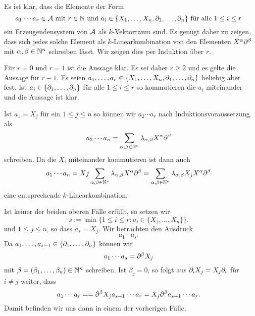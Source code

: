 \documentclass[a4paper,10pt]{article}
\begin{document}
\subsection{}
Es ist klar, dass die Elemente der Form
\[
 a_1 \cdots a_r \in \mathcal{A} \text{ mit }r \in \mathbb{N} \text{ und } a_i \in \{X_1, \ldots, X_n, \partial_1, \ldots, \partial_n\} \text{ für alle } 1 \leq i \leq r
\]
ein Erzeugendensystem von $\mathcal{A}$ als $k$-Vektorraum sind. Es genügt daher zu zeigen, dass sich jedes solche Element als $k$-Linearkombination von den Elementen $X^\alpha \partial^\beta$ mit $\alpha, \beta \in \mathbb{N}^n$ schreiben lässt. Wir zeigen dies per Induktion über $r$.

Für $r = 0$ und $r = 1$ ist die Aussage klar. Es sei daher $r \geq 2$ und es gelte die Aussage für $r-1$. Es seien $a_1, \ldots, a_r \in \{X_1, \ldots, X_n, \partial_1, \ldots, \partial_n\}$ beliebig aber fest. Ist $a_i \in \{\partial_1, \ldots, \partial_n\}$ für alle $1 \leq i \leq r$ so kommutieren die $a_i$ miteinander und die Aussage ist klar.

Ist $a_1 = X_j$ für ein $1 \leq j \leq n$ so können wir $a_2 \cdots a_r$ nach Induktionsvoraussetzung als
\[
 a_2 \cdots a_n = \sum_{\alpha, \beta \in \mathbb{N}^n} \lambda_{\alpha, \beta} X^\alpha \partial^\beta
\]
schreiben. Da die $X_i$ miteinander kommutieren ist dann auch
\[
 a_1 \cdots a_n
 = Xj \sum_{\alpha, \beta \in \mathbb{N}^n} \lambda_{\alpha, \beta} X^\alpha \partial^\beta
 = \sum_{\alpha, \beta \in \mathbb{N}^n} \lambda_{\alpha, \beta} X_j X^\alpha \partial^\beta
\]
eine entsprechende $k$-Linearkombination.

Ist keiner der beiden oberen Fälle erfüllt, so setzen wir
\[
 s := \min \{1 \leq i \leq r : a_i \in \{X_1, \ldots, X_n\}\}.
\]
und $1 \leq j \leq n$, so dass $a_s = X_j$. Wir betrachten den Ausdruck
\[
 a_1 \cdots a_s.
\]
Da $a_1, \ldots, a_{s-1} \in \{\partial_1, \ldots, \partial_n\}$ können wir
\[
 a_1 \cdots a_s = \partial^\beta X_j
\]
mit $\beta = (\beta_1, \ldots, \beta_n) \in \mathbb{N}^n$ schreiben. Ist $\beta_j = 0$, so folgt aus $\partial_i X_j = X_j \partial_i$ für $i \neq j$ weiter, dass
\[
 a_1 \cdots a_r = = \partial^\beta X_j a_{s+1} \cdots a_r = X_j \partial^\beta a_{s+1} \cdots a_r.
\]
Damit befinden wir uns dann in einem der vorherigen Fälle.
\end{document}
